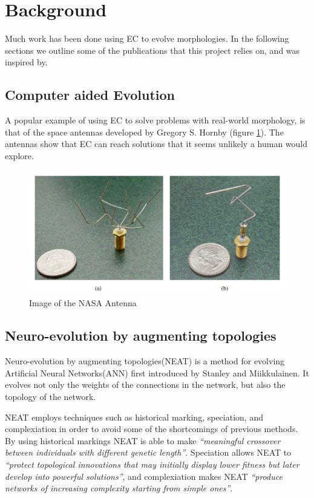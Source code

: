 \section{Background}
Much work has been done using EC to evolve morphologies. In the following
sections we outline some of the publications that this project relies on, and
was inspired by.

\subsection{Computer aided Evolution}
A popular example of using EC to solve problems with real-world
morphology, is that of the space antennas developed by Gregory S.
Hornby\cite{paper:ev4} (figure \ref{fig:nasa_antenna}). The antennas show that
EC can reach solutions that it seems unlikely a human would explore.

\begin{figure}[ht] \includegraphics[scale=.7]{content/img/space_antenna}
\caption{Image of the NASA Antenna \cite{paper:ev4}}
\label{fig:nasa_antenna}
\end{figure}

\subsection{Neuro-evolution by augmenting topologies}
Neuro-evolution by augmenting topologies(NEAT) is a method for evolving 
Artificial Neural Networks(ANN) first introduced by Stanley and 
Miikkulainen\cite{stanley2002evolving}.
It evolves not only the weights of the connections in the network, but also the 
topology of the network.

NEAT employs techniques such as historical marking, speciation, and 
complexiation in order to avoid some of the shortcomings of previous methods.
By using historical markings NEAT is able to make \emph{``meaningful crossover 
between individuals with different
genetic length''}\cite[p.~50]{Floreano2008}.
Speciation allows NEAT to \emph{``protect topological innovations
that may initially display lower fitness but later
develop into powerful solutions''}\cite[p.~50]{Floreano2008}, and complexiation 
makes NEAT \emph{``produce networks of increasing complexity
starting from simple ones''}\cite[p.~50]{Floreano2008}.


